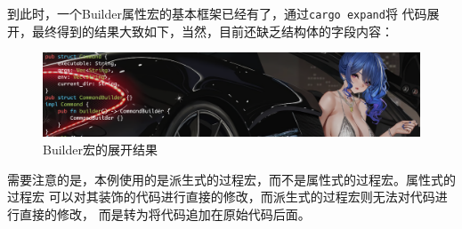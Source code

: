 到此时，一个Builder属性宏的基本框架已经有了，通过\texttt{cargo expand}将
代码展开，最终得到的结果大致如下，当然，目前还缺乏结构体的字段内容：
\begin{figure}[H]
  \centering
  \includegraphics[width=\linewidth]{rust_expand.png}
  \caption{Builder宏的展开结果}
  \label{fig:rust_expand}
\end{figure}

需要注意的是，本例使用的是派生式的过程宏，而不是属性式的过程宏。属性式的过程宏
可以对其装饰的代码进行直接的修改，而派生式的过程宏则无法对代码进行直接的修改，
而是转为将代码追加在原始代码后面。

